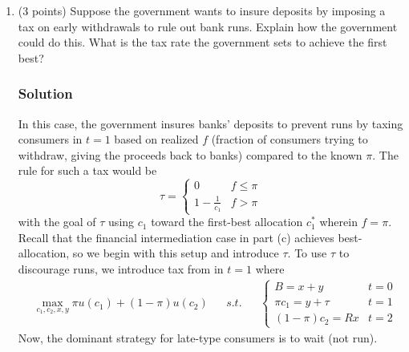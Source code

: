 \documentclass[12pt]{article}
\begin{document}
\begin{enumerate}[label=(\alph*)]
    \item (3 points) Suppose the government wants to insure deposits by imposing a tax on early withdrawals to rule out bank runs. Explain how the government could do this. What is the tax rate the government sets to achieve the first best?
\subsubsection*{Solution}


    In this case, the government insures banks' deposits to prevent runs by taxing consumers in $t=1$ based on realized $f$ (fraction of consumers trying to withdraw, giving the proceeds back to banks) compared to the known $\pi$.
    The rule  for such a tax would be 
    \[ \tau = \begin{cases}
        0 & f \leq \pi 
        \\ 1 - \frac{1}{c_1} & f > \pi 
    \end{cases}\]
    with the goal of $\tau$ using $c_1$ toward the first-best allocation $c_1^*$ wherein $f =\pi$. Recall that the financial intermediation case in part (c) achieves best-allocation, so we begin with this setup and introduce $\tau$. To use $\tau$ to discourage runs, we introduce tax from in $t=1$ where
    \begin{align*}
        &\max_{c_1, c_2, x,y} \pi u(c_1) + (1-\pi)u(c_2) && s.t. && \begin{cases}
            B  =x+y & t=0
            \\ \pi c_1 =y + \tau & t=1
            \\ (1-\pi) c_2 = Rx & t=2
        \end{cases}
    \end{align*}
    Now, the dominant strategy for late-type consumers is to wait (not run).


\end{enumerate}
\end{document}
